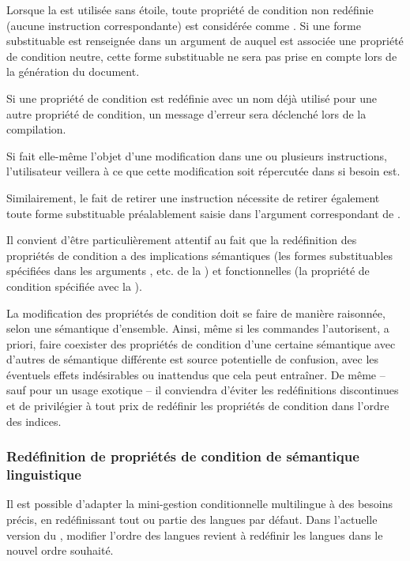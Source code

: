 \documentclass{article}
\begin{document}
Lorsque la  est utilisée sans étoile, toute propriété de condition non redéfinie (aucune instruction  correspondante) est considérée comme . Si une forme substituable est renseignée dans un argument de  auquel est associée une propriété de condition neutre, cette forme substituable ne sera pas prise en compte lors de la génération du document.

Si une propriété de condition est redéfinie avec un nom déjà utilisé pour une autre propriété de condition, un message d'erreur sera déclenché lors de la compilation.

Si  fait elle-même l'objet d'une modification dans une ou plusieurs instructions, l'utilisateur veillera à ce que cette modification soit répercutée dans  si besoin est.

Similairement, le fait de retirer une instruction  nécessite de retirer également toute forme substituable préalablement saisie dans l'argument correspondant de .

Il convient d'être particulièrement attentif au fait que la redéfinition des propriétés de condition a des implications sémantiques (les formes substituables spécifiées dans les arguments ,  etc. de la ) et fonctionnelles (la propriété de condition spécifiée avec la ).

La modification des propriétés de condition doit se faire de manière raisonnée, selon une sémantique d'ensemble. Ainsi, même si les commandes  l'autorisent, a priori, faire coexister des propriétés de condition d'une certaine sémantique avec d'autres de sémantique différente est source potentielle de confusion, avec les éventuels effets indésirables ou inattendus que cela peut entraîner. De même -- sauf pour un usage exotique -- il conviendra d'éviter les redéfinitions discontinues et de privilégier à tout prix de redéfinir les propriétés de condition dans l'ordre des indices.

\subsubsection{Redéfinition de propriétés de condition de sémantique linguistique}\label{CtDoc_Commandes_SetMiniCondiProp-_Multilingue}
Il est possible d'adapter la mini-gestion conditionnelle multilingue à des besoins précis, en redéfinissant tout ou partie des langues par défaut. Dans l'actuelle version du , modifier l'ordre des langues revient à redéfinir les langues dans le nouvel ordre souhaité.
\end{document}
